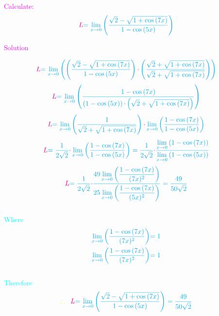 \documentclass[a3paper, 11pt]{memoir}
\begin{document}
  \pagecolor{pagecolor}
  \huge
  \textcolor{magenta}{Calculate:} 
  \begin{equation*}
      \textcolor{magenta}{L}  \textcolor{cyan}{ = \lim_{x \to 0 }   \left(  \dfrac{\sqrt{2}-\sqrt{1+\cos{(7x)}}   }{1-\cos{(5x)}}    \right)      }
  \end{equation*}
  \begin{center}
    \textcolor{magenta}{Solution}
  \end{center}
  \begin{equation*}
    \textcolor{magenta}{L}  \textcolor{cyan}{=    \lim_{x \to 0 }   \left(  \left(\dfrac{\sqrt{2}-\sqrt{1+\cos{(7x)}}   }{1-\cos{(5x)}} \right)  \textcolor{magenta}{\cdot} \left( \dfrac{\sqrt{2}+\sqrt{1+\cos{(7x)}} }{\sqrt{2}+\sqrt{1+\cos{(7x)}} } \right) \right)      }
  \end{equation*}
  \begin{equation*}
    \textcolor{magenta}{L}  \textcolor{cyan}{=    \lim_{x \to 0 }  \left(   \dfrac{1-\cos{(7x)}}{\left(1-\cos{(5x)}\right) \textcolor{magenta}{\cdot}  \left(\sqrt{2}+\sqrt{1+\cos{(7x)}}\right)}   \right)    }
  \end{equation*}
  \begin{equation*}
    \textcolor{magenta}{L}  \textcolor{cyan}{= \lim_{x \to 0 }  \left(  \dfrac{1}{\sqrt{2} +\sqrt{1+\cos{(7x)}}} \right)  \textcolor{magenta}{\cdot}  \lim_{x \to 0 }  \left(  \dfrac{1-\cos{(7x)}}{1-\cos{(5x)}} \right)                 }
  \end{equation*}
  \begin{equation*}
    \textcolor{magenta}{L}  \textcolor{cyan}{=  \dfrac{1}{2\sqrt{2}} \textcolor{magenta}{\cdot}  \lim_{x \to 0 }  \left( \dfrac{1-\cos{(7x)}}{1-\cos{(5x)}}\right) =  \dfrac{1}{2\sqrt{2}} \textcolor{magenta}{\cdot}  \dfrac{\lim\limits_{x \to 0 } \left(1-\cos{(7x)}\right)}{\lim\limits_{x \to 0 } \left(1-\cos{(5x)}\right)} }
  \end{equation*}
  \begin{equation*}
    \textcolor{magenta}{L}  \textcolor{cyan}{= \dfrac{1}{2\sqrt{2}} \textcolor{magenta}{\cdot}  \dfrac{ 49\lim\limits_{x \to 0} \left(\dfrac{1-\cos{(7x)}}{(7x)^{2}}\right) }{  25\lim\limits_{x \to 0} \left(\dfrac{1-\cos{(7x)}}{(5x)^{2}}\right) }   = \dfrac{49}{50\sqrt{2}}       }
  \end{equation*}
  \\
  \textcolor{cyan}{Where}
  \\
  \begin{align*}
    \textcolor{cyan}{\lim\limits_{x \to 0} \left(\dfrac{1-\cos{(7x)}}{(7x)^{2}}\right)} & \textcolor{cyan}{=1}\\
    \textcolor{cyan}{\lim\limits_{x \to 0} \left(\dfrac{1-\cos{(7x)}}{(7x)^{2}}\right)} & \textcolor{cyan}{=1}\\
  \end{align*}
  \\
  \textcolor{cyan}{Therefore}
  \\
    \begin{equation*}
    \textcolor{yellow}{\therefore}\, \, \, \, \, \textcolor{magenta}{L}  \textcolor{cyan}{=  \lim_{x \to 0 }   \left(  \dfrac{\sqrt{2}-\sqrt{1+\cos{(7x)}}   }{1-\cos{(5x)}}   \right)  =  \dfrac{49}{50\sqrt{2}}   }
    \end{equation*}
\end{document}
